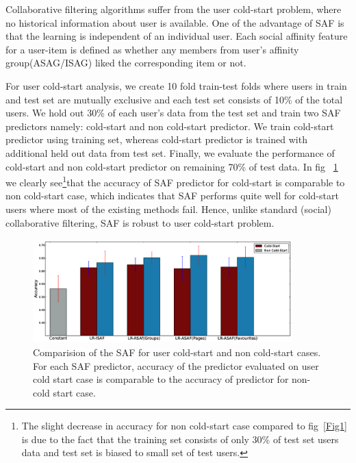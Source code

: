 Collaborative filtering algorithms suffer from the user cold-start problem,
where no historical information about user is available. One of the advantage of SAF is that 
the learning is independent of an individual user. Each social affinity feature for a user-item is
defined as whether any members from user's affinity group(ASAG/ISAG) liked the corresponding item or not. 

For user cold-start analysis, we create 10 fold train-test folds where users in train and test set are mutually exclusive
and each test set consists of 10\% of the total users. We hold out 30\% of each user's data from the test set and train two SAF predictors namely: cold-start and non cold-start predictor.
We train cold-start predictor using training set, whereas cold-start predictor is trained with additional 
held out data from test set. Finally, we evaluate the performance of cold-start and non cold-start predictor on remaining 70\% 
of test data. In fig ~\ref{fig:coldstart} we clearly see\footnote{ The slight decrease in accuracy for non cold-start case compared to 
fig~\ref{Fig1} is due to the fact that the training set consists of only 30\% of test set users data and test 
 set is biased to small set of test users.}that the accuracy of  SAF predictor for cold-start is comparable
to non cold-start case, which indicates that SAF performs quite well for cold-start users where most of the
existing methods fail. Hence, unlike standard (social) collaborative filtering, SAF is robust to user 
cold-start problem.  


\begin{figure}[tbp!]
\hspace{-5mm}\includegraphics[width=100mm,height=40mm]{data/plots/new/cold_start.eps}
\vspace{-3mm}
\caption{Comparision of the SAF for user cold-start and non cold-start cases.
For each SAF predictor, accuracy of the predictor evaluated on user
cold start case is comparable to the accuracy of predictor for non-cold start case.}
\label{fig:coldstart}
\end{figure}
 
